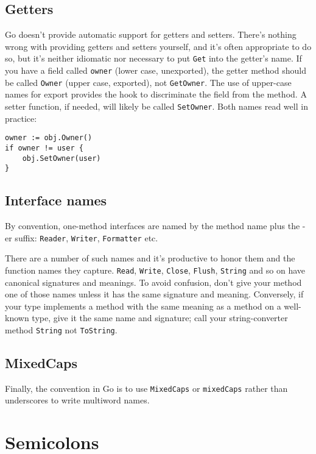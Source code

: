 \subsection*{Getters}

Go doesn't provide automatic support for getters and setters. There's
nothing wrong with providing getters and setters yourself, and it's
often appropriate to do so, but it's neither idiomatic nor necessary to
put \texttt{Get} into the getter's name. If you have a field called
\texttt{owner} (lower case, unexported), the getter method should be
called \texttt{Owner} (upper case, exported), not \texttt{GetOwner}. The
use of upper-case names for export provides the hook to discriminate the
field from the method. A setter function, if needed, will likely be
called \texttt{SetOwner}. Both names read well in practice:

\begin{Verbatim}[frame=single]
owner := obj.Owner()
if owner != user {
    obj.SetOwner(user)
}
\end{Verbatim}

\subsection*{Interface names}

By convention, one-method interfaces are named by the method name plus
the -er suffix: \texttt{Reader}, \texttt{Writer}, \texttt{Formatter}
etc.

There are a number of such names and it's productive to honor them and
the function names they capture. \texttt{Read}, \texttt{Write},
\texttt{Close}, \texttt{Flush}, \texttt{String} and so on have canonical
signatures and meanings. To avoid confusion, don't give your method one
of those names unless it has the same signature and meaning. Conversely,
if your type implements a method with the same meaning as a method on a
well-known type, give it the same name and signature; call your
string-converter method \texttt{String} not \texttt{ToString}.

\subsection*{MixedCaps}

Finally, the convention in Go is to use \texttt{MixedCaps} or
\texttt{mixedCaps} rather than underscores to write multiword names.

\section*{Semicolons}

